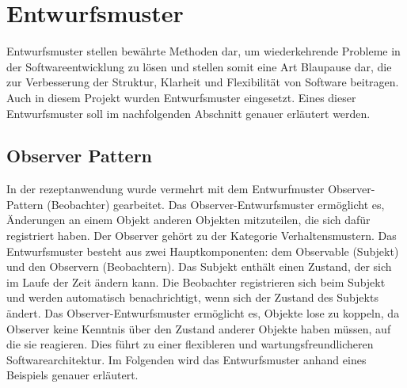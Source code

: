\chapter{Entwurfsmuster}
Entwurfsmuster stellen bewährte Methoden dar, um wiederkehrende Probleme in der Softwareentwicklung zu lösen und stellen somit eine Art Blaupause dar, die zur Verbesserung der Struktur, Klarheit und Flexibilität von Software beitragen.
Auch in diesem Projekt wurden Entwurfsmuster eingesetzt. Eines dieser Entwurfsmuster
soll im nachfolgenden Abschnitt genauer erläutert werden.

\section{Observer Pattern}
In der rezeptanwendung  wurde vermehrt mit dem Entwurfmuster Observer-Pattern (Beobachter) gearbeitet. Das Observer-Entwurfsmuster ermöglicht es, Änderungen an einem Objekt anderen Objekten mitzuteilen, die sich dafür registriert haben. Der Observer gehört zu der Kategorie Verhaltensmustern. Das Entwurfsmuster besteht aus zwei Hauptkomponenten: dem Observable (Subjekt) und den Observern (Beobachtern). 
Das Subjekt enthält einen Zustand, der sich im Laufe der Zeit ändern kann. Die Beobachter registrieren sich beim Subjekt und werden automatisch benachrichtigt, wenn sich der Zustand des Subjekts ändert. Das Observer-Entwurfsmuster ermöglicht es, Objekte lose zu koppeln, da Observer keine Kenntnis über den Zustand anderer Objekte haben müssen, auf die sie reagieren. Dies führt zu einer flexibleren und wartungsfreundlicheren Softwarearchitektur.
Im Folgenden wird das Entwurfsmuster anhand eines Beispiels genauer erläutert.